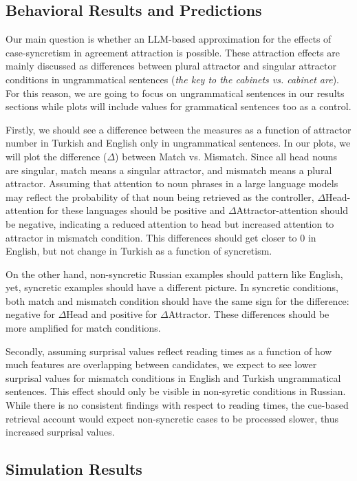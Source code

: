 \documentclass[10pt,letterpaper]{article}
\begin{document}
\subsection{Behavioral Results and Predictions}

Our main question is whether an LLM-based approximation for the effects of case-syncretism in agreement attraction is possible. These attraction effects are mainly discussed as differences between plural attractor and singular attractor conditions in ungrammatical sentences (\textit{the key to the cabinets vs. cabinet are}). For this reason, we are going to focus on ungrammatical sentences in our results sections while plots will include values for grammatical sentences too as a control.

Firstly, we should see a difference between the measures as a function of attractor number in Turkish and English only in ungrammatical sentences. In our plots, we will plot the difference ($\Delta$) between Match vs. Mismatch. Since all head nouns are singular, match means a singular attractor, and mismatch means a plural attractor. Assuming that attention to noun phrases in a large language models may reflect the probability of that noun being retrieved as the controller, $\Delta$Head-attention for these languages should be positive and $\Delta$Attractor-attention should be negative, indicating a reduced attention to head but increased attention to attractor in mismatch condition. This differences should get closer to 0 in English, but not change in Turkish as a function of syncretism.

On the other hand, non-syncretic Russian examples should pattern like English, yet, syncretic examples should have a different picture. In syncretic conditions, both match and mismatch condition should have the same sign for the difference: negative for $\Delta$Head and positive for $\Delta$Attractor. These differences should be more amplified for match conditions. 

Secondly, assuming surprisal values reflect reading times as a function of how much features are overlapping between candidates, we expect to see lower surprisal values for mismatch conditions in English and Turkish ungrammatical sentences. This effect should only be visible in non-syretic conditions in Russian. While there is no consistent findings with respect to reading times, the cue-based retrieval account would expect non-syncretic cases to be processed slower, thus increased surprisal values. 

\subsection{Simulation Results}
\end{document}
